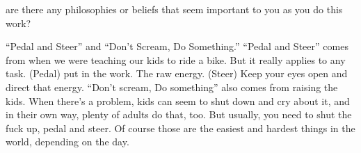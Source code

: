 are there any philosophies or beliefs that seem important to you as
you do this work?  

“Pedal and Steer” and “Don't Scream, Do Something.”
“Pedal and Steer” comes from when we were teaching our kids to ride a
bike. But it really applies to any task. (Pedal) put in the work. The
raw energy. (Steer) Keep your eyes open and direct that energy.
“Don't scream, Do something” also comes from raising the kids. When
there's a problem, kids can seem to shut down and cry about it, and in
their own way, plenty of adults do that, too. But usually, you need to
shut the fuck up, pedal and steer. Of course those are the easiest and
hardest things in the world, depending on the day.
